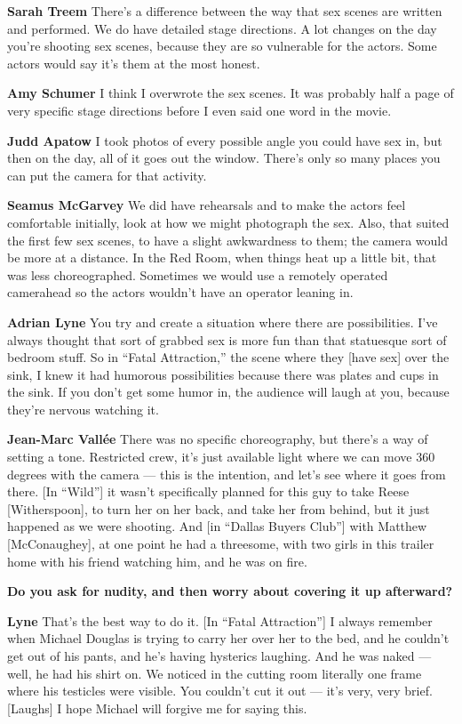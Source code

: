 \textbf{Sarah Treem} There's a difference between the way that sex
scenes are written and performed. We do have detailed stage directions.
A lot changes on the day you're shooting sex scenes, because they are so
vulnerable for the actors. Some actors would say it's them at the most
honest.

\textbf{Amy Schumer} I think I overwrote the sex scenes. It was probably
half a page of very specific stage directions before I even said one
word in the movie.

\textbf{Judd Apatow} I took photos of every possible angle you could
have sex in, but then on the day, all of it goes out the window. There's
only so many places you can put the camera for that activity.

\textbf{Seamus McGarvey} We did have rehearsals and to make the actors
feel comfortable initially, look at how we might photograph the sex.
Also, that suited the first few sex scenes, to have a slight awkwardness
to them; the camera would be more at a distance. In the Red Room, when
things heat up a little bit, that was less choreographed. Sometimes we
would use a remotely operated camerahead so the actors wouldn't have an
operator leaning in.

\textbf{Adrian Lyne} You try and create a situation where there are
possibilities. I've always thought that sort of grabbed sex is more fun
than that statuesque sort of bedroom stuff. So in ``Fatal Attraction,''
the scene where they {[}have sex{]} over the sink, I knew it had
humorous possibilities because there was plates and cups in the sink. If
you don't get some humor in, the audience will laugh at you, because
they're nervous watching it.

\textbf{Jean-Marc Vallée} There was no specific choreography, but
there's a way of setting a tone. Restricted crew, it's just available
light where we can move 360 degrees with the camera --- this is the
intention, and let's see where it goes from there. {[}In ``Wild''{]} it
wasn't specifically planned for this guy to take Reese
{[}Witherspoon{]}, to turn her on her back, and take her from behind,
but it just happened as we were shooting. And {[}in ``Dallas Buyers
Club''{]} with Matthew {[}McConaughey{]}, at one point he had a
threesome, with two girls in this trailer home with his friend watching
him, and he was on fire.

\textbf{Do you ask for nudity, and then worry about covering it up
afterward?}

\textbf{Lyne} That's the best way to do it. {[}In ``Fatal
Attraction''{]} I always remember when Michael Douglas is trying to
carry her over her to the bed, and he couldn't get out of his pants, and
he's having hysterics laughing. And he was naked --- well, he had his
shirt on. We noticed in the cutting room literally one frame where his
testicles were visible. You couldn't cut it out --- it's very, very
brief. {[}Laughs{]} I hope Michael will forgive me for saying this.

